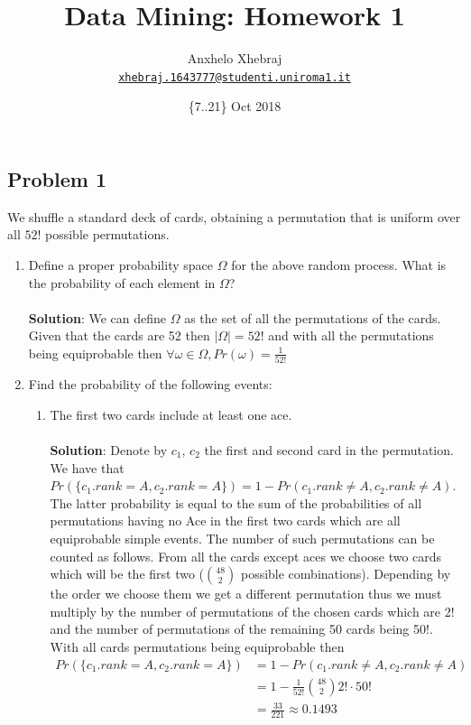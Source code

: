 \documentclass[a4paper]{article}
\title{Data Mining: Homework 1}
\author{Anxhelo Xhebraj \\
        \href{mailto:xhebraj.1643777@studenti.uniroma1.it}{\texttt{xhebraj.1643777@studenti.uniroma1.it}}
        }
\date{\{7..21\} Oct 2018}
\begin{document}
\maketitle

\subsection*{Problem 1}
We shuffle a standard deck of cards, obtaining a permutation that is uniform over all $52!$ possible permutations.
\begin{enumerate}
    \item Define a proper probability space $\Omega$ for the above random process.  What is the probability
of each element in $\Omega$? \\ \\
         \textbf{Solution}: We can define $\Omega$ as the set of all the permutations of the cards. Given that the cards are 52 then $ |\Omega| = 52!$ and with all the permutations being equiprobable then $\forall \omega \in \Omega, Pr(\omega) = \frac{1}{52!}$
    \item Find the probability of the following events:
        \begin{enumerate}
            \item The first two cards include at least one ace. \\ \\
            \textbf{Solution}: Denote by $c_1$, $c_2$ the first and second card in the permutation. We have that $Pr(\{c_1.rank = A, c_2.rank = A\}) = 1 - Pr(c_1.rank \neq A, c_2.rank \neq A)$. The latter probability is equal to the sum of the probabilities of all permutations having no Ace in the first two cards which are all equiprobable simple events. The number of such permutations can be counted as follows. From all the cards except aces we choose two cards which will be the first two ($\binom{48}{2}$ possible combinations). Depending by the order we choose them we get a different permutation thus we must multiply by the number of permutations of the chosen cards which are 2! and the number of permutations of the remaining 50 cards being 50!. With all cards permutations being equiprobable then
            \begin{align*}
                Pr(\{c_1.rank = A, c_2.rank = A\}) &= 1 - Pr(c_1.rank \neq A, c_2.rank \neq A) \\
                                                   &= 1 - \frac{1}{52!} \binom{48}{2} 2! \cdot 50! \\
                                                   &= \frac{33}{221} \approx 0.1493
            \end{align*}
            

\end{enumerate}
\end{enumerate}
\end{document}
